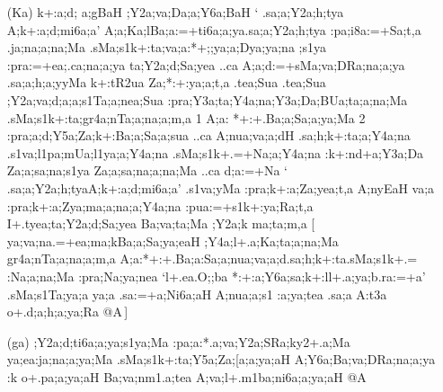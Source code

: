 \begin{spacing}{1.15}
\begin{itemize}
\begin{itemize}
 \item[({\sktf Ka})] {\sktf k+:a;d;%
a;gBaH ;Y2a;va;Da;a;Y6a;BaH} `{\sktf
.sa;a;Y2a;h;tya \ZF{-} A;k+:a;d;mi6a;a}' {\sktf
\ZF{(}A;a;Ka;l\ZF{-}Ba;a:=+ti6a;a;ya\ZF{-}.sa;a;Y2a;h;tya%
\ZF{-}:pa;i8a:=+Sa;t,a\ZF{)} .ja;na;a;na;Ma} {\sktf
.sMa;s1k+:ta;va;a:*+;;ya;a;Dya;ya;na%
;s1ya} {\sktf :pra:=+ea;.ca;na;a;ya\ZF{,} ta;Y2a;d;Sa;yea ..ca
A;a;d:=+sMa;va;DRa;na;a;ya\ZF{,} .sa;a;h;a;yyMa k+:tR2ua Za;*:+:ya;a;t,a 
.tea;Sua .tea;Sua ;Y2a;va;d;a;a;s1Ta;a;nea;Sua
:pra;Y3a;ta;Y4a;na;Y3a;Da;BUa;ta;a;na;Ma .sMa;s1k+:ta;gr4a;nTa;a;na;a;m,a \ZF{(}1\ZF{)} A;a:%
*+:+.Ba;a;Sa;a;ya;Ma \ZF{(}2\ZF{)}
:pra;a;d;Y5a;Za;k+:Ba;a;Sa;a;sua ..ca A;nua;va;a;dH
.sa;h;k+:ta;a;Y4a;na .s1va;l1pa;mUa;l1ya;a;Y4a;na
.sMa;s1k+.=+Na;a;Y4a;na :k+:nd+a;Y3a;Da%
\ZF{-}Za;a;sa;na;s1ya} {Za;a;sa;na;a;na;Ma} {\sktf ..ca d;a:=+Na}  `{\sktf
.sa;a;Y2a;h;tya\ZF{-}A;k+:a;d;mi6a;a}' {\sktf .s1va;yMa
:pra;k+:a;Za;yea;t,a A;nyEaH va;a :pra;k+:a;Zya;ma;a;na;a;Y4a;na
:pua:=+s1k+:ya;Ra;t,a\ZF{,} I+.tyea;ta;Y2a;d;Sa;yea
Ba;va;ta;Ma ;Y2a;k ma;ta;m,a} [{\sktf
ya;va;na\ZF{-}.=+ea;ma;k\ZF{-}Ba;a;Sa;ya;eaH
;Y4a;l+.a;Ka;ta;a;na;Ma gr4a;nTa;a;na;a;m,a
{A;a:*+:}+.Ba;a:Sa;a;nua;va;a;d\ZF{-}.sa;h;k+:ta\ZF{-}.sMa;s1k+.=%
\ZF{-}:Na;a;na;Ma :pra;Na;ya;nea\ZF{,}} `{\sktf l+.ea.O;;ba\ZF{-}{\break}%
*:+:a;Y6a;sa;k+:l\ZF{-}l+.a;ya;b.ra:=+a}'
{\sktf .sMa;s1Ta;ya;a ya;a .sa:=+a;Ni6a;aH A;nua;a;s1%
:a;ya;tea\ZF{,} .sa;a A:t3a o+.d;a;h;a;ya;Ra @A}\,]
                      
\item[({\sktf ga})] {\sktf ;Y2a;d;ti6a;a;ya;s1ya;Ma
:pa;a:*.a;va;Y2a;SRa;ky2+.a;Ma ya;ea:ja;na;a;ya;Ma
.sMa;s1k+:ta;Y5a;Za;[a;a;ya;aH
A;Y6a;Ba;va;DRa;na;a;ya :k o+.pa;a;ya;aH
Ba;va;nm1.a;tea A;va;l+.m1ba;ni6a;a;ya;aH @A}
 \end{itemize} 
\end{itemize}
\end{spacing}

